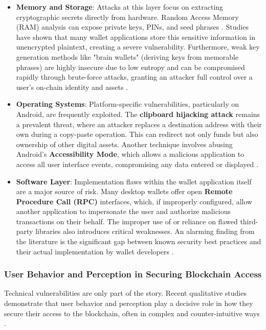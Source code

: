 \begin{itemize}
	\item \textbf{Memory and Storage}: Attacks at this layer focus on extracting cryptographic secrets directly from hardware. Random Access Memory (RAM) analysis can expose private keys, PINs, and seed phrases \cite{houy2023}. Studies have shown that many wallet applications store this sensitive information in unencrypted plaintext, creating a severe vulnerability. Furthermore, weak key generation methods like "brain wallets" (deriving keys from memorable phrases) are highly insecure due to low entropy and can be compromised rapidly through brute-force attacks, granting an attacker full control over a user's on-chain identity and assets \cite{houy2023}.
	
	\item \textbf{Operating Systems}: Platform-specific vulnerabilities, particularly on Android, are frequently exploited. The \textbf{clipboard hijacking attack} remains a prevalent threat, where an attacker replaces a destination address with their own during a copy-paste operation. This can redirect not only funds but also ownership of other digital assets. Another technique involves abusing Android's \textbf{Accessibility Mode}, which allows a malicious application to access all user interface events, compromising any data entered or displayed \cite{houy2023}.
	
	\item \textbf{Software Layer}: Implementation flaws within the wallet application itself are a major source of risk. Many desktop wallets offer open \textbf{Remote Procedure Call (RPC)} interfaces, which, if improperly configured, allow another application to impersonate the user and authorize malicious transactions on their behalf. The improper use of or reliance on flawed third-party libraries also introduces critical weaknesses. An alarming finding from the literature is the significant gap between known security best practices and their actual implementation by wallet developers \cite{houy2023}.
\end{itemize}

\subsubsection{User Behavior and Perception in Securing Blockchain Access}
Technical vulnerabilities are only part of the story. Recent qualitative studies demonstrate that user behavior and perception play a decisive role in how they secure their access to the blockchain, often in complex and counter-intuitive ways \cite{yu2024}.

